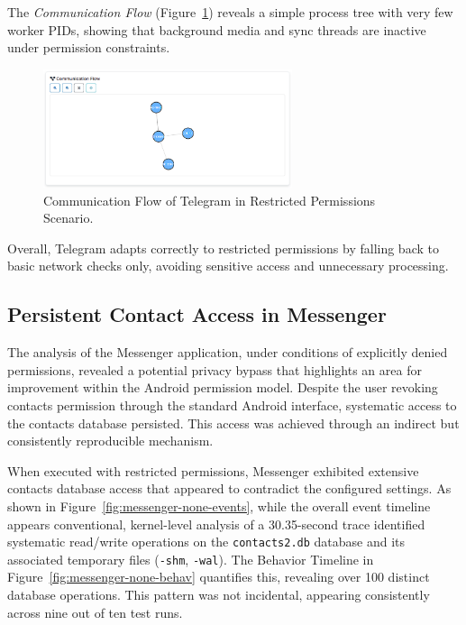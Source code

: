 \documentclass[a4paper,12pt]{report}
\begin{document}
The \textit{Communication Flow} (Figure~\ref{fig:telegram-none-flow}) reveals a simple process tree with very few worker PIDs, showing that background media and sync threads are inactive under permission constraints.

\begin{figure}[H]
    \centering
    \includegraphics[width=0.65\textwidth]{telegram-none-flow.png}
    \caption{Communication Flow of Telegram in Restricted Permissions Scenario.}
    \label{fig:telegram-none-flow}
\end{figure}

Overall, Telegram adapts correctly to restricted permissions by falling back to basic network checks only, avoiding sensitive access and unnecessary processing.

\subsection{Persistent Contact Access in Messenger}
\label{sec:messenger_anomaly}
The analysis of the Messenger application, under conditions of explicitly denied permissions, revealed a potential privacy bypass that highlights an area for improvement within the Android permission model. Despite the user revoking contacts permission through the standard Android interface, systematic access to the contacts database persisted. This access was achieved through an indirect but consistently reproducible mechanism.

When executed with restricted permissions, Messenger exhibited extensive contacts database access that appeared to contradict the configured settings. As shown in Figure~\ref{fig:messenger-none-events}, while the overall event timeline appears conventional, kernel-level analysis of a 30.35-second trace identified systematic read/write operations on the \texttt{contacts2.db} database and its associated temporary files (\texttt{-shm}, \texttt{-wal}). The Behavior Timeline in Figure~\ref{fig:messenger-none-behav} quantifies this, revealing over 100 distinct database operations. This pattern was not incidental, appearing consistently across nine out of ten test runs.
\end{document}
